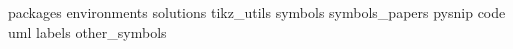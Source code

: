\usepackage{import}

{packages}
{environments}
{solutions}
{tikz_utils}
{symbols}
{symbols_papers}
{pysnip}
{code}
{uml}
{labels}
{other_symbols}

